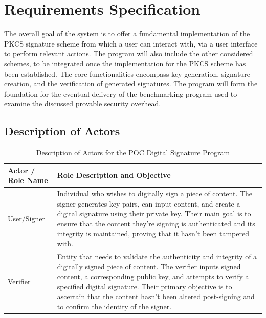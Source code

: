 \documentclass[]{final_report}
\theoremstyle{definition}
\begin{document}
\section{Requirements Specification}
The overall goal of the system is to offer a fundamental implementation of the PKCS signature scheme from which a user can interact with, via a user interface to perform relevant actions. The program will also include the other considered schemes, to be integrated once the implementation for the PKCS scheme has been established.
The core functionalities encompass key generation, signature creation, and the verification of generated signatures.
The program will form the foundation for the eventual delivery of the benchmarking program used to examine the discussed provable security overhead.

\subsection{Description of Actors}
\begin{table}[H]
    \centering
    \caption{Description of Actors for the POC Digital Signature Program}
    \label{tab:actors_description}
    \begin{tabular}{|l|p{10cm}|}
    \hline
    \textbf{Actor / Role Name} & \textbf{Role Description and Objective} \\
    \hline
    User/Signer & Individual who wishes to digitally sign a piece of content. The signer generates key pairs, can input content, and create a digital signature using their private key. Their main goal is to ensure that the content they're signing is authenticated and its integrity is maintained, proving that it hasn't been tampered with. \\
    \hline
    Verifier & Entity that needs to validate the authenticity and integrity of a digitally signed piece of content. The verifier inputs signed content, a corresponding public key, and attempts to verify a specified digital signature. Their primary objective is to ascertain that the content hasn't been altered post-signing and to confirm the identity of the signer. \\
    \hline
    \end{tabular}
\end{table}
\end{document}

